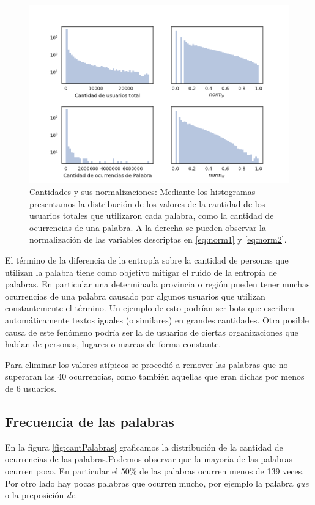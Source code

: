 \begin{figure}[!ht]
\centering
\includegraphics[width=1.0\textwidth]{./images/train/sinFiltro/cantNorms_sinFiltro.pdf}
\caption{Cantidades y sus normalizaciones: Mediante los histogramas presentamos la distribución de los valores de la cantidad de los usuarios totales que utilizaron cada palabra, como la cantidad de ocurrencias de una palabra. A la derecha se pueden observar la normalización de las variables descriptas en \ref{eq:norm1} y \ref{eq:norm2}.} 
\label{fig:cantNorms} 
\end{figure}

El término de la diferencia de la entropía sobre la cantidad de personas que utilizan la palabra tiene como objetivo mitigar el ruido de la entropía de palabras. En particular una determinada provincia o región pueden tener muchas ocurrencias de una palabra causado por algunos usuarios que utilizan constantemente el término. Un ejemplo de esto podrían ser bots que escriben automáticamente textos iguales (o similares) en grandes cantidades. Otra posible causa de este fenómeno podría ser la de usuarios de ciertas organizaciones que hablan de personas, lugares o marcas de forma constante.

Para eliminar los valores atípicos se procedió a remover las palabras que no superaran las 40 ocurrencias, como también aquellas que eran dichas por menos de 6 usuarios. 

\subsection{Frecuencia de las palabras}
\label{sub: frecuenciaPalabras}
En la figura \ref{fig:cantPalabras} graficamos la distribución de la cantidad de ocurrencias de las palabras.Podemos observar que la mayoría de las palabras ocurren poco. En particular el 50\% de las palabras ocurren menos de 139 veces. Por otro lado hay pocas palabras que ocurren mucho, por ejemplo la palabra \textit{que} o la preposición \textit{de}.

